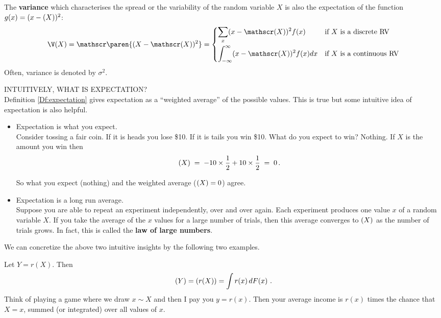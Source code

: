 The \textbf{variance} which characterises the spread or the
  variability of the random variable $X$ is also the expectation of the
  function $g(x)=(x-\mathscr{(}X))^2$:
\[
\V(X)  = \E \paren{ (X-\E(X))^2 }  = 
\begin{cases}
\displaystyle\sum_x (x-\E(X))^2 f(x) & \text{if $X$ is a discrete RV}\\[12pt]
\displaystyle\int_{-\infty}^{\infty} (x-\E(X))^2 f(x) dx & \text{if $X$ is a continuous RV}
\end{cases}
\] 
Often, variance is denoted by $\sigma^2$. 

INTUITIVELY, WHAT IS EXPECTATION?\\

Definition \ref{Df:expectation} gives expectation as a ``weighted average'' of the possible values. This is true but some intuitive idea of expectation is also helpful.
\begin{itemize}
\item Expectation is what you expect. \\[6pt]
Consider tossing a fair coin. If it is heads you lose \$10. If it is tails you win \$10. 
What do you expect to win? Nothing. 
If $X$ is the amount you win then $$\mathscr{(}X)\;=\;-10\times \frac{1}{2}+10\times \frac{1}{2}\;=\;0\,.$$

So what you expect (nothing) and the weighted average ($\mathscr{(}X)=0$) agree.


\item Expectation is a long run average.\\[6pt]
Suppose you are able to repeat an experiment independently, over and over again. 
Each experiment produces one value $x$ of a random variable $X$.  
If you take the average of the $x$ values for a large number of trials, then this average converges to $\mathscr{(}X)$ as the number of trials grows.  In fact, this is called the {\bf law of large numbers}.
\end{itemize}

We can concretize the above two intuitive insights by the following two examples.

\begin{example}\label{EgWinningsOnAverage}
Let $Y = r(X)$.  Then
\[
\mathscr{(}Y) = \mathscr{(}r(X)) = \int r(x)\, d F(x) \ .
\]
Think of playing a game where we draw $x \sim X$ and then I pay you $y=r(x)$.  Then your average income is $r(x)$ times the chance that $X=x$, summed (or integrated) over all values of $x$.
\end{example}


